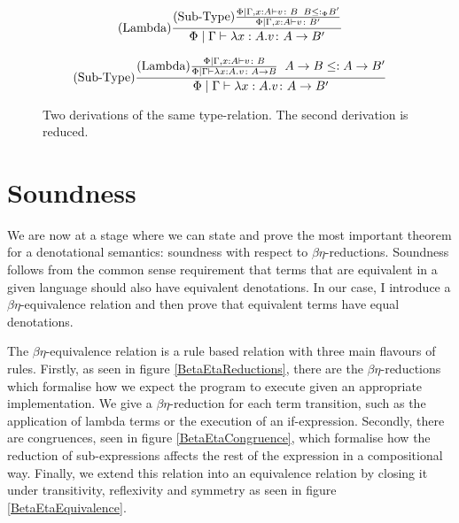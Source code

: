 \documentclass{Report}
\begin{document}
\begin{figure}[h!]
\begin{equation}
    (\text{Lambda}) \frac{
        (\text{Sub-Type}) \frac{
            \Phi\mid\Gamma, x: A \vdash v \colon B
            \;\;
            B \leq:_\Phi B'
        }{
            \Phi\mid\Gamma, x: A \vdash v \colon B'
        }
    }{\Phi\mid\Gamma \vdash \lambda x : A. v \colon A\rightarrow B'}
\end{equation}

\begin{equation}
    (\text{Sub-Type}) \frac{    (\text{Lambda}) \frac{
            \Phi\mid\Gamma, x: A \vdash v \colon B
    }{\Phi\mid\Gamma \vdash \lambda x : A. v \colon A\rightarrow B}
    \;\; A\rightarrow B \leq: A\rightarrow B'}{\Phi\mid\Gamma \vdash \lambda x : A. v \colon A\rightarrow B'}
\end{equation}
    \caption{Two derivations of the same type-relation. The second derivation is reduced.}
\end{figure}

\section{Soundness}
We are now at a stage where we can state and prove the most important theorem for a denotational semantics: soundness with respect to $\beta\eta$-reductions. Soundness follows from the common sense requirement that terms that are equivalent in a given language should also have equivalent denotations. In our case, I introduce a $\beta\eta$-equivalence relation and then prove that equivalent terms have equal denotations.

The $\beta\eta$-equivalence relation is a rule based relation with three main flavours of rules. Firstly, as seen in figure \ref{BetaEtaReductions}, there are the $\beta\eta$-reductions which formalise how we expect the program to execute given an appropriate implementation. We give a $\beta\eta$-reduction for each term transition, such as the application of lambda terms or the execution of an if-expression. Secondly, there are congruences, seen in figure \ref{BetaEtaCongruence}, which formalise how the reduction of sub-expressions affects the rest of the expression in a compositional way. Finally, we extend this relation into an equivalence relation by closing it under transitivity, reflexivity and symmetry as seen in figure \ref{BetaEtaEquivalence}.
\end{document}
